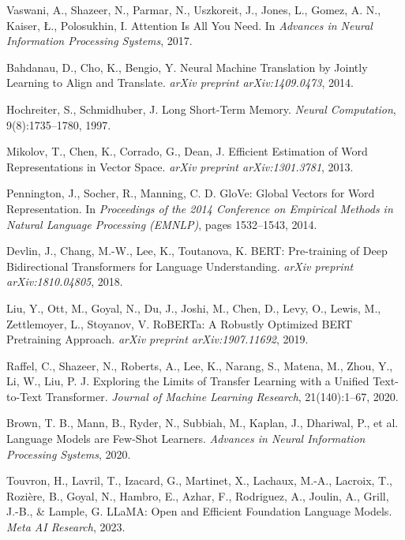 \documentclass[conference]{IEEEtran}
\begin{document}
\begin{thebibliography}{999}

Vaswani, A., Shazeer, N., Parmar, N., Uszkoreit, J., Jones, L., Gomez, A. N., Kaiser, Ł., Polosukhin, I.
\newblock Attention Is All You Need.
\newblock In \emph{Advances in Neural Information Processing Systems}, 2017.

Bahdanau, D., Cho, K., Bengio, Y.
\newblock Neural Machine Translation by Jointly Learning to Align and Translate.
\newblock \emph{arXiv preprint arXiv:1409.0473}, 2014.

Hochreiter, S., Schmidhuber, J.
\newblock Long Short-Term Memory.
\newblock \emph{Neural Computation}, 9(8):1735–1780, 1997.

Mikolov, T., Chen, K., Corrado, G., Dean, J.
\newblock Efficient Estimation of Word Representations in Vector Space.
\newblock \emph{arXiv preprint arXiv:1301.3781}, 2013.

Pennington, J., Socher, R., Manning, C. D.
\newblock GloVe: Global Vectors for Word Representation.
\newblock In \emph{Proceedings of the 2014 Conference on Empirical Methods in Natural Language Processing (EMNLP)}, pages 1532–1543, 2014.

Devlin, J., Chang, M.-W., Lee, K., Toutanova, K.
\newblock BERT: Pre-training of Deep Bidirectional Transformers for Language Understanding.
\newblock \emph{arXiv preprint arXiv:1810.04805}, 2018.

Liu, Y., Ott, M., Goyal, N., Du, J., Joshi, M., Chen, D., Levy, O., Lewis, M., Zettlemoyer, L., Stoyanov, V.
\newblock RoBERTa: A Robustly Optimized BERT Pretraining Approach.
\newblock \emph{arXiv preprint arXiv:1907.11692}, 2019.

Raffel, C., Shazeer, N., Roberts, A., Lee, K., Narang, S., Matena, M., Zhou, Y., Li, W., Liu, P. J.
\newblock Exploring the Limits of Transfer Learning with a Unified Text-to-Text Transformer.
\newblock \emph{Journal of Machine Learning Research}, 21(140):1–67, 2020.

Brown, T. B., Mann, B., Ryder, N., Subbiah, M., Kaplan, J., Dhariwal, P., et al.
\newblock Language Models are Few-Shot Learners.
\newblock \emph{Advances in Neural Information Processing Systems}, 2020.

Touvron, H., Lavril, T., Izacard, G., Martinet, X., Lachaux, M.-A., Lacroix, T., Rozière, B., Goyal, N., Hambro, E., Azhar, F., Rodriguez, A., Joulin, A., Grill, J.-B., \& Lample, G.
\newblock LLaMA: Open and Efficient Foundation Language Models.
\newblock \emph{Meta AI Research}, 2023.


\end{thebibliography}
\end{document}
